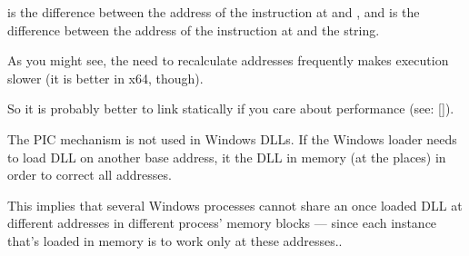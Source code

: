  is the difference between the address of the instruction at  and \globvar{}, and 
 is the difference between the address of the instruction at 
 and the \retstring{} string.

As you might see, the need to recalculate addresses frequently makes execution slower 
(it is better in x64, though).

So it is probably better to link statically if you care about performance (see: [\AgnerFogCPP]).


The PIC mechanism is not used in Windows DLLs. If the Windows loader needs to load DLL 
on another base address, it  the DLL in memory (at the  places) in order to correct 
all addresses.

This implies that several Windows processes cannot share an once loaded DLL 
at different addresses in different process' memory 
blocks --- since each instance that's loaded in memory is  to work only at these addresses..

